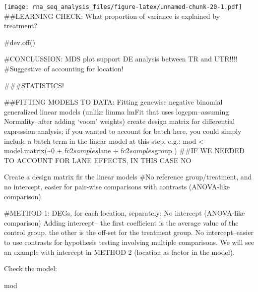 \documentclass[
]{article}
\newenvironment{Shaded}{\begin{snugshade}}{\end{snugshade}}
\newcommand{\CommentTok}[1]{\textcolor[rgb]{0.56,0.35,0.01}{\textit{#1}}}
\newcommand{\DecValTok}[1]{\textcolor[rgb]{0.00,0.00,0.81}{#1}}
\newcommand{\KeywordTok}[1]{\textcolor[rgb]{0.13,0.29,0.53}{\textbf{#1}}}
\newcommand{\NormalTok}[1]{#1}
\newcommand{\OperatorTok}[1]{\textcolor[rgb]{0.81,0.36,0.00}{\textbf{#1}}}
\newcommand{\StringTok}[1]{\textcolor[rgb]{0.31,0.60,0.02}{#1}}
\begin{document}
\texttt{[image: rna\_seq\_analysis\_files/figure-latex/unnamed-chunk-20-1.pdf]}
\#\#LEARNING CHECK: What proportion of variance is explained by
treatment?

\#dev.off()

\#CONCLUSSION: MDS plot support DE analysis between TR and UTR!!!!
\#Suggestive of accounting for location!

\#\#\#STATISTICS!

\#\#FITTING MODELS TO DATA: Fitting genewise negative binomial
generalized linear models (unlike limma lmFit that uses logcpm--assuming
Normality--after adding `voom' weights) create design matrix for
differential expression analysis; if you wanted to account for batch
here, you could simply include a batch term in the linear model at this
step, e.g.: mod \textless- model.matrix(\textasciitilde0 +
fc2\(samples\)lane + fc2\(samples\)group ) \#\#IF WE NEEDED TO ACCOUNT
FOR LANE EFFECTS, IN THIS CASE NO

Create a design matrix fir the linear models \#No reference
group/treatment, and no intercept, easier for pair-wise comparisons with
contrasts (ANOVA-like comparison)

\#METHOD 1: DEGs, for each location, separately: No intercept
(ANOVA-like comparison) Adding intercept-- the first coefficient is the
average value of the control group, the other is the off-set for the
treatment group. No intercept--easier to use contrasts for hypothesis
testing involving multiple comparisons. We will see an example with
intercept in METHOD 2 (location as factor in the model).

\begin{Shaded}
\end{Shaded}

Check the model:

\begin{Shaded}
\begin{Highlighting}[]
\NormalTok{mod}
\end{Highlighting}
\end{Shaded}
\end{document}
